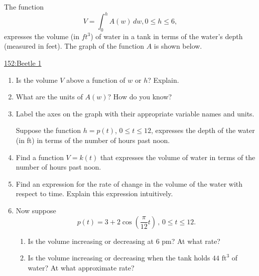 \documentclass{ximera}
\begin{document}
\begin{question}\label{QWEdrf4}
The function
\[
V =\int_0^h A(w)\, dw, 0\leq h \leq 6,
\]
expresses the volume (in $ft^3$) of water in a tank in terms of the water’s depth (measured in feet). The graph of the function $A$ is shown below.


\begin{onlineOnly}
    \begin{center}
\end{center}
\end{onlineOnly}

\href{https://www.desmos.com/calculator/ae516hl7j6}{152:Beetle 1}




\begin{enumerate}

\item Is the volume $V$ above a function of $w$ or $h$? Explain.

\item What are the units of $A(w)$? How do you know?

\item Label the axes on the graph with their appropriate variable names and
units.



Suppose the function $h = p(t)$, $0 \leq t \leq 12$, expresses the depth of the water (in ft) in terms of the number of hours past noon.

\item Find a function $V = k(t)$ that expresses the volume of water in terms of
the number of hours past noon.

\item Find an expression for the rate of change in the volume of the water with respect to time. Explain this expression intuitively.

\item Now suppose
\[
p(t) = 3 + 2 \cos\left( \frac{\pi}{12}t \right) \,,\, 0 \leq t \leq 12.
\]
\begin{enumerate}
    \item Is the volume increasing or decreasing at 6 pm? At what rate?
    \item Is the volume increasing or decreasing when the tank holds $44\text{ ft}^3$ of
water? At what approximate rate?

\end{enumerate}
  
\end{enumerate}
\end{question}
\end{document}
